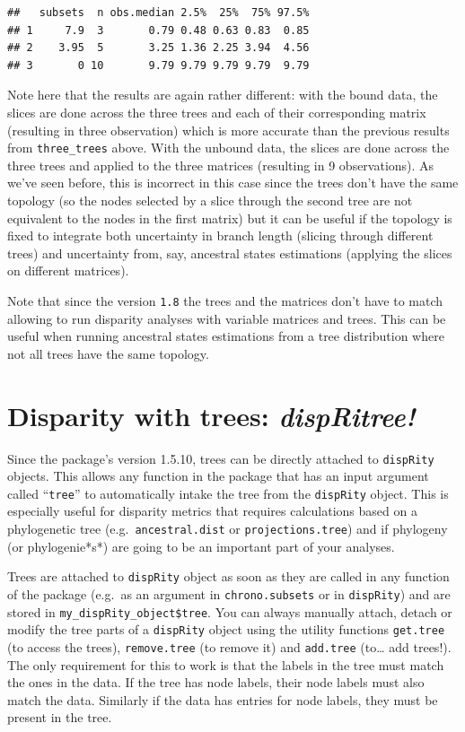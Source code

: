 \documentclass[
]{book}
\begin{document}
\begin{verbatim}
##   subsets  n obs.median 2.5%  25%  75% 97.5%
## 1     7.9  3       0.79 0.48 0.63 0.83  0.85
## 2    3.95  5       3.25 1.36 2.25 3.94  4.56
## 3       0 10       9.79 9.79 9.79 9.79  9.79
\end{verbatim}

Note here that the results are again rather different: with the bound data, the slices are done across the three trees and each of their corresponding matrix (resulting in three observation) which is more accurate than the previous results from \texttt{three\_trees} above.
With the unbound data, the slices are done across the three trees and applied to the three matrices (resulting in 9 observations).
As we've seen before, this is incorrect in this case since the trees don't have the same topology (so the nodes selected by a slice through the second tree are not equivalent to the nodes in the first matrix) but it can be useful if the topology is fixed to integrate both uncertainty in branch length (slicing through different trees) and uncertainty from, say, ancestral states estimations (applying the slices on different matrices).

Note that since the version \texttt{1.8} the trees and the matrices don't have to match allowing to run disparity analyses with variable matrices and trees.
This can be useful when running ancestral states estimations from a tree distribution where not all trees have the same topology.

\hypertarget{dispRitree}{%
\section{\texorpdfstring{Disparity with trees: \emph{dispRitree!}}{Disparity with trees: dispRitree!}}\label{dispRitree}}

Since the package's version 1.5.10, trees can be directly attached to \texttt{dispRity} objects.
This allows any function in the package that has an input argument called ``\texttt{tree}'' to automatically intake the tree from the \texttt{dispRity} object.
This is especially useful for disparity metrics that requires calculations based on a phylogenetic tree (e.g.~\texttt{ancestral.dist} or \texttt{projections.tree}) and if phylogeny (or phylogenie*s*) are going to be an important part of your analyses.

Trees are attached to \texttt{dispRity} object as soon as they are called in any function of the package (e.g.~as an argument in \texttt{chrono.subsets} or in \texttt{dispRity}) and are stored in \texttt{my\_dispRity\_object\$tree}.
You can always manually attach, detach or modify the tree parts of a \texttt{dispRity} object using the utility functions \texttt{get.tree} (to access the trees), \texttt{remove.tree} (to remove it) and \texttt{add.tree} (to\ldots{} add trees!).
The only requirement for this to work is that the labels in the tree must match the ones in the data.
If the tree has node labels, their node labels must also match the data.
Similarly if the data has entries for node labels, they must be present in the tree.
\end{document}

